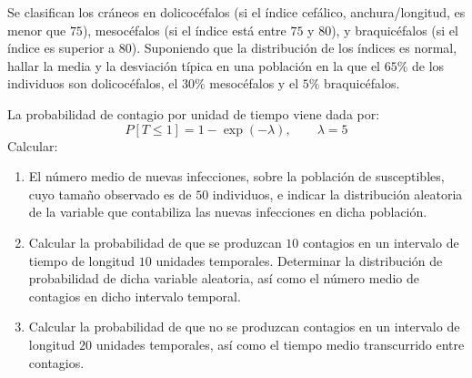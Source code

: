 \begin{ejercicio}
    Se clasifican los cráneos en dolicocéfalos (si el índice cefálico, anchura/longitud, es menor que $75$), mesocéfalos (si el índice está entre $75$ y $80$), y braquicéfalos (si el índice es superior a $80$). Suponiendo que la distribución de los índices es normal, hallar la media y la desviación típica en una población en la que el $65\%$ de los individuos son dolicocéfalos, el $30\%$ mesocéfalos y el $5\%$ braquicéfalos.
\end{ejercicio}

\begin{ejercicio}
    La probabilidad de contagio por unidad de tiempo viene dada por:
    \begin{equation*}
        P[T \leq 1] = 1-\exp(-\lambda), \qquad \lambda = 5
    \end{equation*}
    Calcular:
    \begin{enumerate}
        \item El número medio de nuevas infecciones, sobre la población de susceptibles, cuyo tamaño observado es de $50$ individuos, e indicar la distribución aleatoria de la variable que contabiliza las nuevas infecciones en dicha población.
        \item Calcular la probabilidad de que se produzcan $10$ contagios en un intervalo de tiempo de longitud $10$ unidades temporales. Determinar la distribución de probabilidad de dicha variable aleatoria, así como el número medio de contagios en dicho intervalo temporal.
        \item Calcular la probabilidad de que no se produzcan contagios en un intervalo de longitud $20$ unidades temporales, así como
        el tiempo medio transcurrido entre contagios.
    \end{enumerate}
\end{ejercicio}

